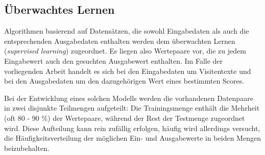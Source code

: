 
    

\begin{figure}[htbp]
    \captionsetup{justification=centering}

    \centering
    
    \centering
    \caption{}
    \label{fig:linear}
\end{figure}

\subsection{Überwachtes Lernen}\label{section:supervised_learning}

Algorithmen basierend auf Datensätzen, die sowohl Eingabedaten als auch die entsprechenden Ausgabedaten enthalten werden dem überwachten Lernen (\textit{supervised learning}) zugeordnet\citep{russellArtificialIntelligenceModern2020}. Es liegen also Wertepaare vor, die zu jedem Eingabewert auch den gesuchten Ausgabewert enthalten. Im Falle der vorliegenden Arbeit handelt es sich bei den Eingabedaten um Visitentexte und bei den Ausgabedaten um den dazugehörigen Wert eines bestimmten Scores. 

Bei der Entwicklung eines solchen Modells werden die vorhandenen Datenpaare in zwei disjunkte Teilmengen aufgeteilt: Die Trainingsmenge enthält die Mehrheit (oft 80 - 90 \%) der Wertepaare, während der Rest der Testmenge zugeordnet wird. Diese Aufteilung kann rein zufällig erfolgen, häufig wird allerdings versucht, die Häufigkeitsverteilung der möglichen Ein- und Ausgabewerte in beiden Mengen beizubehalten.

